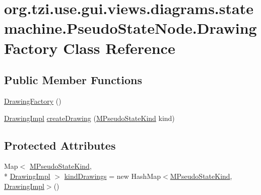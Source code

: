 \hypertarget{classorg_1_1tzi_1_1use_1_1gui_1_1views_1_1diagrams_1_1statemachine_1_1_pseudo_state_node_1_1_drawing_factory}{\section{org.\-tzi.\-use.\-gui.\-views.\-diagrams.\-statemachine.\-Pseudo\-State\-Node.\-Drawing\-Factory Class Reference}
\label{classorg_1_1tzi_1_1use_1_1gui_1_1views_1_1diagrams_1_1statemachine_1_1_pseudo_state_node_1_1_drawing_factory}
}
\subsection*{Public Member Functions}
\begin{DoxyCompactItemize}
\item 
\hyperlink{classorg_1_1tzi_1_1use_1_1gui_1_1views_1_1diagrams_1_1statemachine_1_1_pseudo_state_node_1_1_drawing_factory_aa6525405ce1dff1531de0b0d20bc2198}{Drawing\-Factory} ()
\item 
\hyperlink{interfaceorg_1_1tzi_1_1use_1_1gui_1_1views_1_1diagrams_1_1statemachine_1_1_pseudo_state_node_1_1_drawing_impl}{Drawing\-Impl} \hyperlink{classorg_1_1tzi_1_1use_1_1gui_1_1views_1_1diagrams_1_1statemachine_1_1_pseudo_state_node_1_1_drawing_factory_a763e709a639fe9b809223577cdde4242}{create\-Drawing} (\hyperlink{enumorg_1_1tzi_1_1use_1_1uml_1_1mm_1_1statemachines_1_1_m_pseudo_state_kind}{M\-Pseudo\-State\-Kind} kind)
\end{DoxyCompactItemize}
\subsection*{Protected Attributes}
\begin{DoxyCompactItemize}
\item 
Map$<$ \hyperlink{enumorg_1_1tzi_1_1use_1_1uml_1_1mm_1_1statemachines_1_1_m_pseudo_state_kind}{M\-Pseudo\-State\-Kind}, \\*
\hyperlink{interfaceorg_1_1tzi_1_1use_1_1gui_1_1views_1_1diagrams_1_1statemachine_1_1_pseudo_state_node_1_1_drawing_impl}{Drawing\-Impl} $>$ \hyperlink{classorg_1_1tzi_1_1use_1_1gui_1_1views_1_1diagrams_1_1statemachine_1_1_pseudo_state_node_1_1_drawing_factory_a01a3ac41b6f7d3570c6f2ec0a616f772}{kind\-Drawings} = new Hash\-Map$<$\hyperlink{enumorg_1_1tzi_1_1use_1_1uml_1_1mm_1_1statemachines_1_1_m_pseudo_state_kind}{M\-Pseudo\-State\-Kind}, \hyperlink{interfaceorg_1_1tzi_1_1use_1_1gui_1_1views_1_1diagrams_1_1statemachine_1_1_pseudo_state_node_1_1_drawing_impl}{Drawing\-Impl}$>$()
\end{DoxyCompactItemize}


